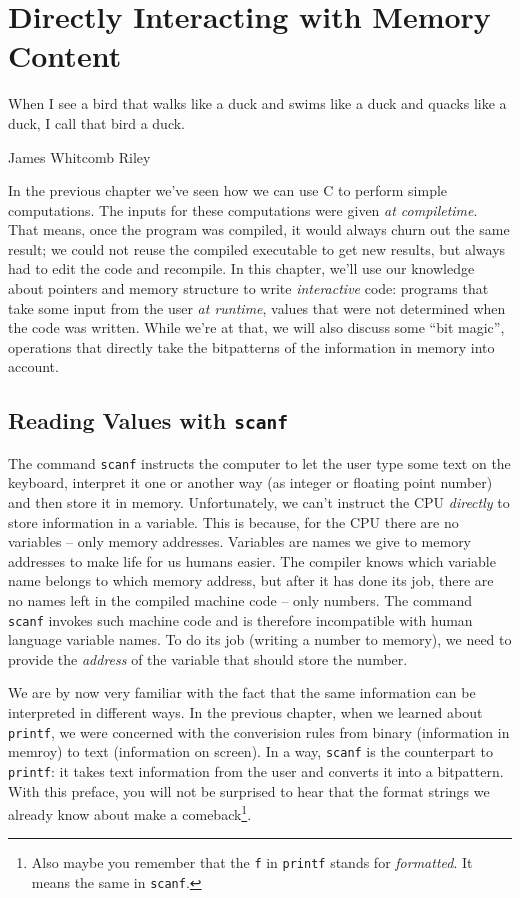 \chapter{Directly Interacting with Memory Content}\label{chp:casting}
\epigraph{When I see a bird that walks like a duck and swims like a duck and quacks like a duck, I call that bird a duck.}{James Whitcomb Riley}

In the previous chapter we've seen how we can use C to perform simple computations. The inputs for these computations were given \emph{at compiletime}. That means, once the program was compiled, it would always churn out the same result; we could not reuse the compiled executable to get new results, but always had to edit the code and recompile. In this chapter, we'll use our knowledge about pointers and memory structure to write \emph{interactive} code: programs that take some input from the user \emph{at runtime}, \ie values that were not determined when the code was written. While we're at that, we will also discuss some \enquote{bit magic}, \ie operations that directly take the bitpatterns of the information in memory into account.

\section{Reading Values with \texttt{scanf}}
The command \texttt{scanf} instructs the computer to let the user type some text on the keyboard, interpret it one or another way (\eg as integer or floating point number) and then store it in memory. Unfortunately, we can't instruct the CPU \emph{directly} to store information in a variable. This is because, for the CPU there are no variables -- only memory addresses. Variables are names we give to memory addresses to make life for us humans easier. The compiler knows which variable name belongs to which memory address, but after it has done its job, there are no names left in the compiled machine code -- only numbers. The command \texttt{scanf} invokes such machine code and is therefore incompatible with human language variable names. To do its job (writing a number to memory), we need to provide the \emph{address} of the variable that should store the number.

We are by now very familiar with the fact that the same information can be interpreted in different ways. In the previous chapter, when we learned about \texttt{printf}, we were concerned with the converision rules from binary (information in memroy) to text (information on screen). In a way, \texttt{scanf} is the counterpart to \texttt{printf}: it takes text information from the user and converts it into a bitpattern. With this preface, you will not be surprised to hear that the format strings we already know about make a comeback\footnote{Also maybe you remember that the \texttt{f} in \texttt{printf} stands for \emph{formatted}. It means the same in \texttt{scanf}.}.

